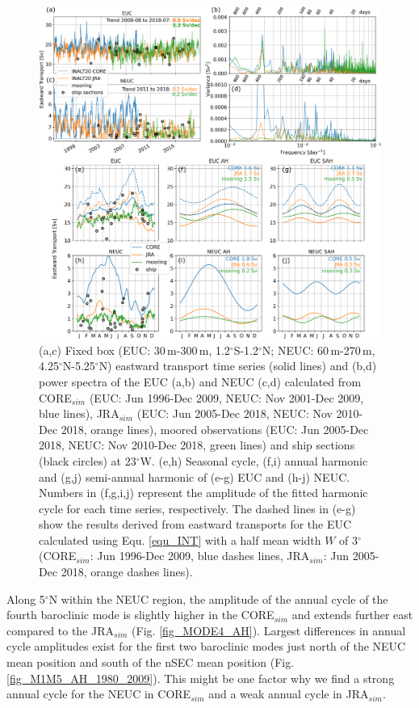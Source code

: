\documentclass[os, manuscript]{copernicus}
\begin{document}
	\begin{figure}[t]
		\includegraphics[width=12cm]{../../figures/paper/f05_EUC_NEUC_comp.png}
		\caption{(a,c) Fixed box (EUC: 30$\,$m-300$\,$m, 1.2$^{\circ}$S-1.2$^{\circ}$N; NEUC: 60$\,$m-270$\,$m, 4.25$^{\circ}$N-5.25$^{\circ}$N) eastward transport time series (solid lines) and (b,d) power spectra of the EUC (a,b) and NEUC (c,d) calculated from CORE$_{sim}$ (EUC: Jun 1996-Dec 2009, NEUC: Nov 2001-Dec 2009, blue lines), JRA$_{sim}$ (EUC: Jun 2005-Dec 2018, NEUC: Nov 2010-Dec 2018, orange lines), moored observations (EUC: Jun 2005-Dec 2018, NEUC: Nov 2010-Dec 2018, green lines) and ship sections (black circles) at 23$^{\circ}$W. (e,h) Seasonal cycle, (f,i) annual harmonic and (g,j) semi-annual harmonic of (e-g) EUC and (h-j) NEUC. Numbers in (f,g,i,j) represent the amplitude of the fitted harmonic cycle for each time series, respectively. The dashed lines in (e-g) show the results derived from eastward transports for the EUC calculated using Equ. \ref{equ_INT} with a half mean width $ W $ of 3$^{\circ}$ (CORE$_{sim}$: Jun 1996-Dec 2009, blue dashes lines, JRA$_{sim}$: Jun 2005-Dec 2018, orange dashes lines).}
		\label{fig_EUC_NEUC_ts}
	\end{figure}
	
	Along 5$^{\circ}$N within the NEUC region, the amplitude of the annual cycle of the fourth baroclinic mode is slightly higher in the CORE$_{sim}$ and extends further east compared to the JRA$_{sim}$ (Fig. \ref{fig_MODE4_AH}). Largest differences in annual cycle amplitudes exist for the first two baroclinic modes just north of the NEUC mean position and south of the nSEC mean position (Fig. \ref{fig_M1M5_AH_1980_2009}). This might be one factor why we find a strong annual cycle for the NEUC in CORE$_{sim}$ and a weak annual cycle in JRA$_{sim}$. 
	
\end{document}
